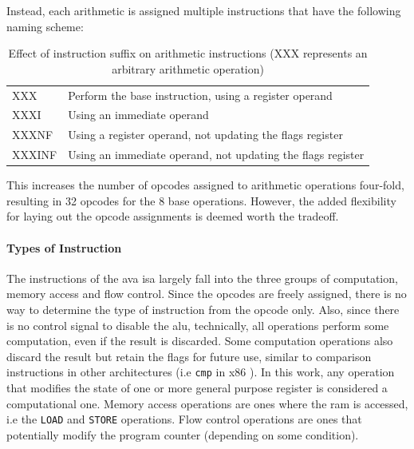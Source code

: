 Instead, each arithmetic is assigned multiple instructions that have the following naming scheme:

\begin{table}[H]
    \centering
    \begin{tabular}{ll}
        XXX    & Perform the base instruction, using a register operand       \\
        XXXI   & Using an immediate operand                                   \\
        XXXNF  & Using a register operand, not updating the flags register    \\
        XXXINF & Using an immediate operand, not updating the flags register 
    \end{tabular}    
    \caption[Instruction suffixes]{Effect of instruction suffix on arithmetic instructions (XXX represents an arbitrary arithmetic operation)}
    \label{tab:instruction_suffices}
\end{table}
\vspace{1em}

This increases the number of opcodes assigned to arithmetic operations four-fold, resulting in 32 opcodes for the 8 base operations. However, the added flexibility for laying out the opcode assignments is deemed worth the tradeoff.

\paragraph*{Types of Instruction}

The instructions of the \ac{ava} \ac{isa} largely fall into the three groups of computation, memory access and flow control. Since the opcodes are freely assigned, there is no way to determine the type of instruction from the opcode only. Also, since there is no control signal to disable the \ac{alu}, technically, all operations perform some computation, even if the result is discarded. Some computation operations also discard the result but retain the flags for future use, similar to comparison instructions in other architectures (i.e \texttt{cmp} in x86 \cite{intelASM86Manual1983}). In this work, any operation that modifies the state of one or more general purpose register is considered a computational one. Memory access operations are ones where the \ac{ram} is accessed, i.e the \texttt{LOAD} and \texttt{STORE} operations. Flow control operations are ones that potentially modify the program counter (depending on some condition).



